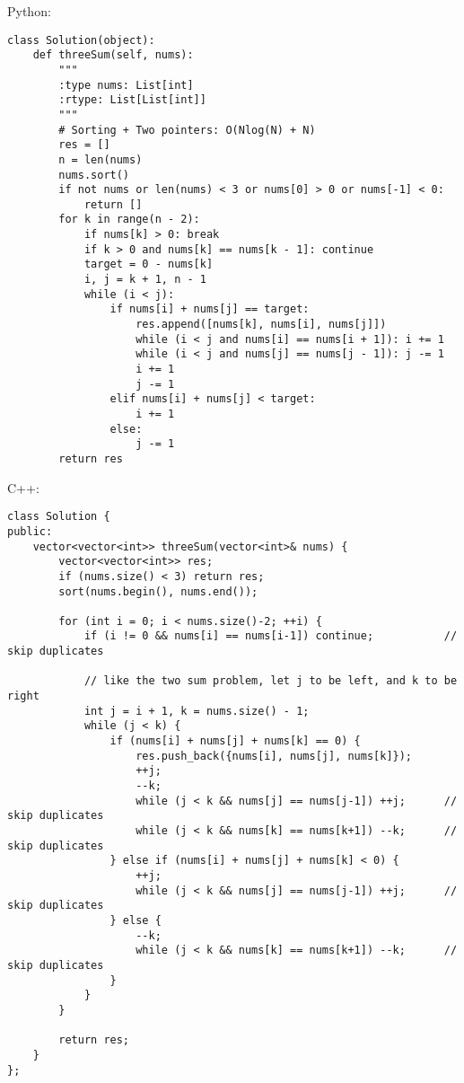 Python:
\lstset{language=python}
\begin{lstlisting}
class Solution(object):
    def threeSum(self, nums):
        """
        :type nums: List[int]
        :rtype: List[List[int]]
        """
        # Sorting + Two pointers: O(Nlog(N) + N)
        res = []
        n = len(nums)
        nums.sort()
        if not nums or len(nums) < 3 or nums[0] > 0 or nums[-1] < 0: 
            return []
        for k in range(n - 2):
            if nums[k] > 0: break
            if k > 0 and nums[k] == nums[k - 1]: continue
            target = 0 - nums[k]
            i, j = k + 1, n - 1
            while (i < j):
                if nums[i] + nums[j] == target:
                    res.append([nums[k], nums[i], nums[j]])
                    while (i < j and nums[i] == nums[i + 1]): i += 1
                    while (i < j and nums[j] == nums[j - 1]): j -= 1
                    i += 1
                    j -= 1
                elif nums[i] + nums[j] < target:
                    i += 1
                else:
                    j -= 1
        return res\end{lstlisting}

C++:
\lstset{language=C++}
\begin{lstlisting}
class Solution {
public:
    vector<vector<int>> threeSum(vector<int>& nums) {
        vector<vector<int>> res;
        if (nums.size() < 3) return res;
        sort(nums.begin(), nums.end());

        for (int i = 0; i < nums.size()-2; ++i) {
            if (i != 0 && nums[i] == nums[i-1]) continue;           // skip duplicates
            
            // like the two sum problem, let j to be left, and k to be right
            int j = i + 1, k = nums.size() - 1;                     
            while (j < k) {
                if (nums[i] + nums[j] + nums[k] == 0) {
                    res.push_back({nums[i], nums[j], nums[k]});
                    ++j;
                    --k;
                    while (j < k && nums[j] == nums[j-1]) ++j;      // skip duplicates
                    while (j < k && nums[k] == nums[k+1]) --k;      // skip duplicates
                } else if (nums[i] + nums[j] + nums[k] < 0) {
                    ++j;
                    while (j < k && nums[j] == nums[j-1]) ++j;      // skip duplicates
                } else {
                    --k;
                    while (j < k && nums[k] == nums[k+1]) --k;      // skip duplicates
                }
            }
        }
        
        return res;
    }
};
\end{lstlisting}


